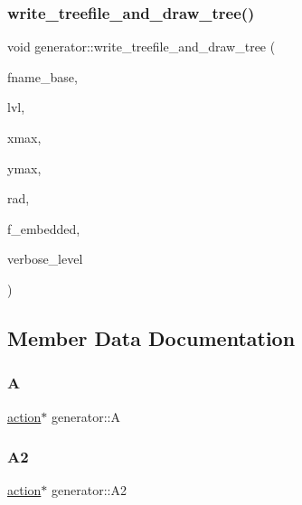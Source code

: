 \subsubsection{\texorpdfstring{write\+\_\+treefile\+\_\+and\+\_\+draw\+\_\+tree()}{write\_treefile\_and\_draw\_tree()}}
{\footnotesize\ttfamily void generator\+::write\+\_\+treefile\+\_\+and\+\_\+draw\+\_\+tree (\begin{DoxyParamCaption}\item[{\mbox{\hyperlink{galois_8h_ab6cc7b4aeb6ea31aba2b3fbfc83ff5e6}{B\+Y\+TE}} $\ast$}]{fname\+\_\+base,  }\item[{\mbox{\hyperlink{galois_8h_a09fddde158a3a20bd2dcadb609de11dc}{I\+NT}}}]{lvl,  }\item[{\mbox{\hyperlink{galois_8h_a09fddde158a3a20bd2dcadb609de11dc}{I\+NT}}}]{xmax,  }\item[{\mbox{\hyperlink{galois_8h_a09fddde158a3a20bd2dcadb609de11dc}{I\+NT}}}]{ymax,  }\item[{\mbox{\hyperlink{galois_8h_a09fddde158a3a20bd2dcadb609de11dc}{I\+NT}}}]{rad,  }\item[{\mbox{\hyperlink{galois_8h_a09fddde158a3a20bd2dcadb609de11dc}{I\+NT}}}]{f\+\_\+embedded,  }\item[{\mbox{\hyperlink{galois_8h_a09fddde158a3a20bd2dcadb609de11dc}{I\+NT}}}]{verbose\+\_\+level }\end{DoxyParamCaption})}



\subsection{Member Data Documentation}
\mbox{\label{classgenerator_a6d63c44007eb96239d50c9bc0f21622c}} 
\subsubsection{\texorpdfstring{A}{A}}
{\footnotesize\ttfamily \mbox{\hyperlink{classaction}{action}}$\ast$ generator\+::A}

\mbox{\label{classgenerator_a481f47df2fa87dbb8123e16a230e6f66}} 
\subsubsection{\texorpdfstring{A2}{A2}}
{\footnotesize\ttfamily \mbox{\hyperlink{classaction}{action}}$\ast$ generator\+::\+A2}

